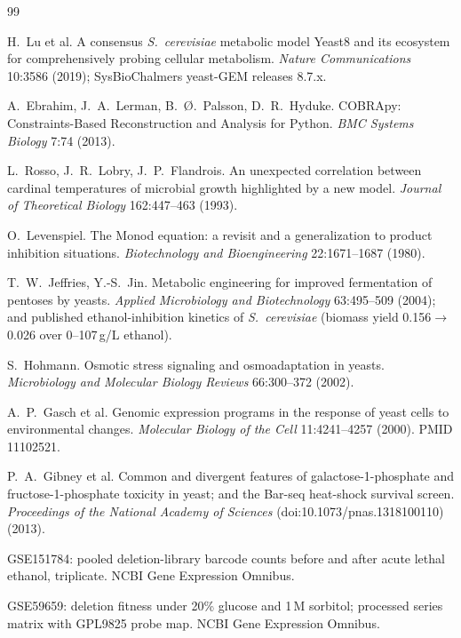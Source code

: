 \documentclass[12pt]{article}
\begin{document}
\begin{thebibliography}{99}

 H.\ Lu et al. A consensus \emph{S.\ cerevisiae}
metabolic model Yeast8 and its ecosystem for comprehensively probing
cellular metabolism. \emph{Nature Communications} 10:3586 (2019);
SysBioChalmers yeast-GEM releases 8.7.x.

 A.\ Ebrahim, J.\ A.\ Lerman, B.\ \O.\ Palsson, D.\ R.\
Hyduke. COBRApy: Constraints-Based Reconstruction and Analysis for
Python. \emph{BMC Systems Biology} 7:74 (2013).

 L.\ Rosso, J.\ R.\ Lobry, J.\ P.\ Flandrois. An
unexpected correlation between cardinal temperatures of microbial
growth highlighted by a new model. \emph{Journal of Theoretical
Biology} 162:447--463 (1993).

 O.\ Levenspiel. The Monod equation: a revisit and
a generalization to product inhibition situations. \emph{Biotechnology
and Bioengineering} 22:1671--1687 (1980).

 T.\ W.\ Jeffries, Y.-S.\ Jin. Metabolic engineering
for improved fermentation of pentoses by yeasts.
\emph{Applied Microbiology and Biotechnology} 63:495--509 (2004);
and published ethanol-inhibition kinetics of \emph{S.\ cerevisiae}
(biomass yield 0.156$\to$0.026 over 0--107\,g/L ethanol).

 S.\ Hohmann. Osmotic stress signaling and
osmoadaptation in yeasts. \emph{Microbiology and Molecular Biology
Reviews} 66:300--372 (2002).

 A.\ P.\ Gasch et al. Genomic expression programs in the
response of yeast cells to environmental changes.
\emph{Molecular Biology of the Cell} 11:4241--4257 (2000). PMID 11102521.

 P.\ A.\ Gibney et al. Common and divergent features of
galactose-1-phosphate and fructose-1-phosphate toxicity in yeast; and
the Bar-seq heat-shock survival screen.
\emph{Proceedings of the National Academy of Sciences}
(doi:10.1073/pnas.1318100110) (2013).

 GSE151784: pooled deletion-library barcode counts
before and after acute lethal ethanol, triplicate. NCBI Gene Expression
Omnibus.

 GSE59659: deletion fitness under 20\% glucose and
1\,M sorbitol; processed series matrix with GPL9825 probe map. NCBI
Gene Expression Omnibus.


\end{thebibliography}
\end{document}
